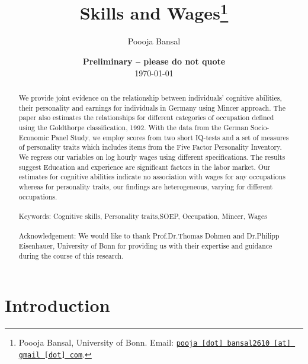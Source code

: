 \documentclass[11pt, a4paper, leqno]{article}
\begin{document}
\title{Skills and Wages\thanks{Poooja Bansal, University of Bonn. Email: \href{mailto:pooja.bansal2610@gmail.com}{\nolinkurl{pooja [dot] bansal2610 [at] gmail [dot] com}}.}}

\author{Poooja Bansal}

\date{
{\bf Preliminary -- please do not quote} 
\\[1ex] 
\today
}

\maketitle


\begin{abstract}
	We provide joint evidence on the relationship between individuals’ cognitive abilities, their personality and earnings for individuals in  Germany using Mincer approach. The paper also estimates the relationships for different categories of occupation defined using the Goldthorpe  classification, 1992. With the data from the German Socio-Economic Panel Study, we employ scores from two short IQ-tests and a set of measures of personality traits which includes items from the Five Factor Personality Inventory. We regress our variables on log hourly wages using different specifications. The results suggest Education and experience are significant factors in the labor market. Our estimates for cognitive abilities indicate no association with wages for any occupations whereas for personality traits, our findings are heterogeneous, varying for different occupations.\\
\\
Keywords: Cognitive skills, Personality traits,SOEP, Occupation, Mincer, Wages \\
\\
Acknowledgement:  We would like to thank Prof.Dr.Thomas Dohmen and Dr.Philipp  Eisenhauer, University of Bonn for providing us with their expertise and guidance during the course of this research.
\end{abstract}
\clearpage

\section{Introduction} %
\label{sec:introduction}
\end{document}

